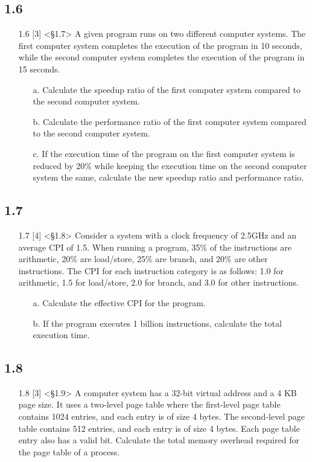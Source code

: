 \documentclass{article}
\begin{document}
\subsection*{1.6}
\begin{enumerate}
    \item[1.6] [3] <§1.7> A given program runs on two different computer systems. The first computer system completes the execution of the program in 10 seconds, while the second computer system completes the execution of the program in 15 seconds.
    \begin{enumerate}
        \item[a.] Calculate the speedup ratio of the first computer system compared to the second computer system.
        \item[b.] Calculate the performance ratio of the first computer system compared to the second computer system.
        \item[c.] If the execution time of the program on the first computer system is reduced by 20\% while keeping the execution time on the second computer system the same, calculate the new speedup ratio and performance ratio.
    \end{enumerate}
\end{enumerate}

\subsection*{1.7}
\begin{enumerate}
    \item[1.7] [4] <§1.8> Consider a system with a clock frequency of 2.5GHz and an average CPI of 1.5. When running a program, 35\% of the instructions are arithmetic, 20\% are load/store, 25\% are branch, and 20\% are other instructions. The CPI for each instruction category is as follows: 1.0 for arithmetic, 1.5 for load/store, 2.0 for branch, and 3.0 for other instructions.
    \begin{enumerate}
        \item[a.] Calculate the effective CPI for the program.
        \item[b.] If the program executes 1 billion instructions, calculate the total execution time.
    \end{enumerate}
\end{enumerate}

\subsection*{1.8}
\begin{enumerate}
    \item[1.8] [3] <§1.9> A computer system has a 32-bit virtual address and a 4 KB page size. It uses a two-level page table where the first-level page table contains 1024 entries, and each entry is of size 4 bytes. The second-level page table contains 512 entries, and each entry is of size 4 bytes. Each page table entry also has a valid bit. Calculate the total memory overhead required for the page table of a process.
\end{enumerate}
\end{document}
